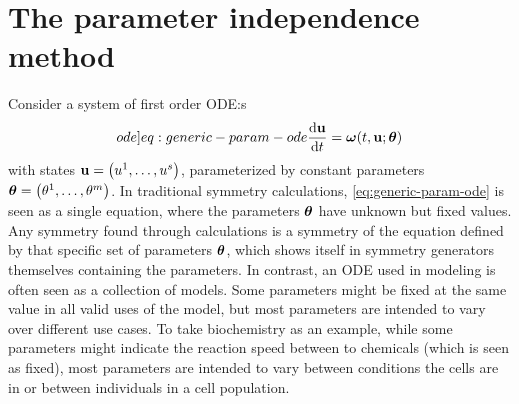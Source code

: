 \section{The parameter independence method}

Consider a system of first order ODE:s
\begin{equation} \label[ode]{eq:generic-param-ode}
  \diff{\vb{u}}{t} = \vb*{\omega}(t, \vb{u}; \vb*{\theta})
\end{equation}
with states \(\vb{u} = \left(u^1, \dots, u^s\right)\), parameterized by constant parameters \(\vb*{\theta} = \left(\theta^1, \dots, \theta^m\right)\).
In traditional symmetry calculations, \cref{eq:generic-param-ode} is seen as a single equation, where the parameters \(\vb*{\theta}\) have unknown but fixed values.
Any symmetry found through calculations is a symmetry of the equation defined by that specific set of parameters \(\vb*{\theta}\), which shows itself in symmetry generators themselves containing the parameters.
In contrast, an ODE used in modeling is often seen as a collection of models.
Some parameters might be fixed at the same value in all valid uses of the model, but most parameters are intended to vary over different use cases.
To take biochemistry as an example, while some parameters might indicate the reaction speed between to chemicals (which is seen as fixed), most parameters are intended to vary between conditions the cells are in or between individuals in a cell population.

